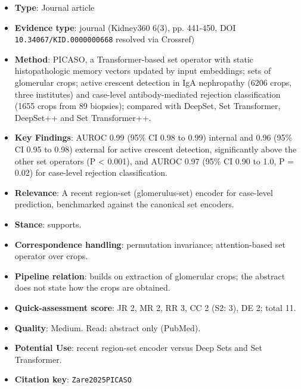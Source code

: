 \documentclass[journal,onecolumn]{IEEEtran}
\begin{document}
\begin{itemize}

\item{} \textbf{Type}: Journal article

\item{} \textbf{Evidence type}: journal (Kidney360 6(3), pp. 441-450, DOI \nolinkurl{10.34067/KID.0000000668} resolved via Crossref)

\item{} \textbf{Method}: PICASO, a Transformer-based set operator with static histopathologic memory vectors updated by input embeddings; sets of glomerular crops; active crescent detection in IgA nephropathy (6206 crops, three institutes) and case-level antibody-mediated rejection classification (1655 crops from 89 biopsies); compared with DeepSet, Set Transformer, DeepSet++ and Set Transformer++.

\item{} \textbf{Key Findings}: AUROC 0.99 (95\% CI 0.98 to 0.99) internal and 0.96 (95\% CI 0.95 to 0.98) external for active crescent detection, significantly above the other set operators (P \textless{} 0.001), and AUROC 0.97 (95\% CI 0.90 to 1.0, P = 0.02) for case-level rejection classification.

\item{} \textbf{Relevance}: A recent region-set (glomerulus-set) encoder for case-level prediction, benchmarked against the canonical set encoders.

\item{} \textbf{Stance}: supports.

\item{} \textbf{Correspondence handling}: permutation invariance; attention-based set operator over crops.

\item{} \textbf{Pipeline relation}: builds on extraction of glomerular crops; the abstract does not state how the crops are obtained.

\item{} \textbf{Quick-assessment score}: JR 2, MR 2, RR 3, CC 2 (S2: 3), DE 2; total 11.

\item{} \textbf{Quality}: Medium. Read: abstract only (PubMed).

\item{} \textbf{Potential Use}: recent region-set encoder versus Deep Sets and Set Transformer.

\item{} \textbf{Citation key}: \texttt{Zare2025PICASO}

\end{itemize}
\end{document}
